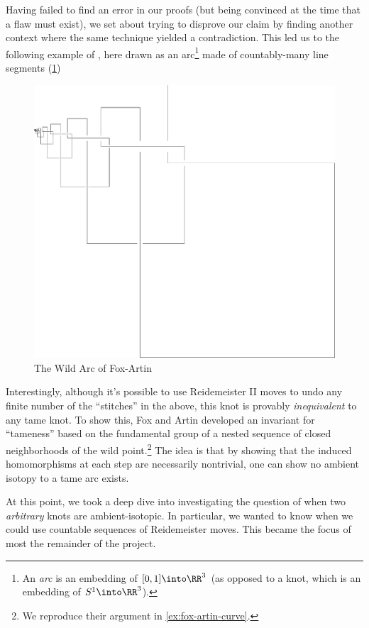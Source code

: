 Having failed to find an error in our proofs (but being convinced at
the time that a flaw must exist), we set about trying to disprove our
claim by finding another context where the same technique yielded a
contradiction. This led us to the following example of
\cite{FoxArtin}, here drawn as an arc\footnote{An \emph{arc} is an
  embedding of $[0,1] \into \RR^3$ (as opposed to a knot, which is an
  embedding of $S^1 \into \RR^3$).} made of countably-many line
segments (\cref{fig:fox-artin-ce})
\begin{figure}[H]
  \centering
  \includegraphics[scale=.19]{figures/preface/loops-no-boxes.pdf}
  \caption{The Wild Arc of Fox-Artin}
  \label{fig:fox-artin-ce}
\end{figure}
Interestingly, although it's possible to use Reidemeister II moves to
undo any finite number of the ``stitches'' in the above, this knot is
provably \emph{inequivalent} to any tame knot. To show this, Fox and
Artin developed an invariant for ``tameness'' based on the fundamental
group of a nested sequence of closed neighborhoods of the wild
point.\footnote{We reproduce their argument in
  \cref{ex:fox-artin-curve}.} The idea is that by showing that the
induced homomorphisms at each step are necessarily nontrivial, one can
show no ambient isotopy to a tame arc exists.

At this point, we took a deep dive into investigating the question of
when two \emph{arbitrary} knots are ambient-isotopic. In particular,
we wanted to know when we could use countable sequences of
Reidemeister moves. This became the focus of most the remainder of the
project.

